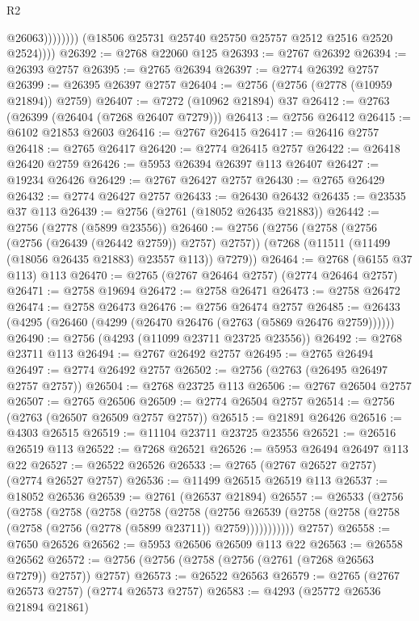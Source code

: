 \begin{lexlean}{R2}
\begin{coremodule}
                          @26063))))))))
          (@18506 @25731 @25740 @25750 @25757 @2512 @2516 @2520 @2524))))
@26392 := @2768 @22060 @125
@26393 := @2767 @26392
@26394 := @26393 @2757
@26395 := @2765 @26394
@26397 := @2774 @26392 @2757
@26399 := @26395 @26397 @2757
@26404 := @2756 (@2756 (@2778 (@10959 @21894)) @2759)
@26407 := @7272 (@10962 @21894) @37
@26412 := @2763 (@26399 (@26404 (@7268 @26407 @7279)))
@26413 := @2756 @26412
@26415 := @6102 @21853 @2603
@26416 := @2767 @26415
@26417 := @26416 @2757
@26418 := @2765 @26417
@26420 := @2774 @26415 @2757
@26422 := @26418 @26420 @2759
@26426 := @5953 @26394 @26397 @113 @26407
@26427 := @19234 @26426
@26429 := @2767 @26427 @2757
@26430 := @2765 @26429
@26432 := @2774 @26427 @2757
@26433 := @26430 @26432
@26435 := @23535 @37 @113
@26439 := @2756 (@2761 (@18052 @26435 @21883))
@26442 := @2756 (@2778 (@5899 @23556))
@26460 := @2756
    (@2756
      (@2758 (@2756 (@2756 (@26439 (@26442 @2759)) @2757) @2757))
      (@7268 (@11511 (@11499 (@18056 @26435 @21883) @23557 @113)) @7279))
@26464 := @2768 (@6155 @37 @113) @113
@26470 := @2765 (@2767 @26464 @2757) (@2774 @26464 @2757)
@26471 := @2758 @19694
@26472 := @2758 @26471
@26473 := @2758 @26472
@26474 := @2758 @26473
@26476 := @2756 @26474 @2757
@26485 := @26433 (@4295 (@26460 (@4299 (@26470 @26476 (@2763 (@5869 @26476 @2759))))))
@26490 := @2756 (@4293 (@11099 @23711 @23725 @23556))
@26492 := @2768 @23711 @113
@26494 := @2767 @26492 @2757
@26495 := @2765 @26494
@26497 := @2774 @26492 @2757
@26502 := @2756 (@2763 (@26495 @26497 @2757 @2757))
@26504 := @2768 @23725 @113
@26506 := @2767 @26504 @2757
@26507 := @2765 @26506
@26509 := @2774 @26504 @2757
@26514 := @2756 (@2763 (@26507 @26509 @2757 @2757))
@26515 := @21891 @26426
@26516 := @4303 @26515
@26519 := @11104 @23711 @23725 @23556
@26521 := @26516 @26519 @113
@26522 := @7268 @26521
@26526 := @5953 @26494 @26497 @113 @22
@26527 := @26522 @26526
@26533 := @2765 (@2767 @26527 @2757) (@2774 @26527 @2757)
@26536 := @11499 @26515 @26519 @113
@26537 := @18052 @26536
@26539 := @2761 (@26537 @21894)
@26557 := @26533
    (@2756
      (@2758
        (@2758
          (@2758
            (@2758
              (@2758
                (@2756
                  @26539
                  (@2758 (@2758 (@2758 (@2758 (@2756 (@2778 (@5899 @23711)) @2759)))))))))))
      @2757)
@26558 := @7650 @26526
@26562 := @5953 @26506 @26509 @113 @22
@26563 := @26558 @26562
@26572 := @2756 (@2756 (@2758 (@2756 (@2761 (@7268 @26563 @7279)) @2757)) @2757)
@26573 := @26522 @26563
@26579 := @2765 (@2767 @26573 @2757) (@2774 @26573 @2757)
@26583 := @4293 (@25772 @26536 @21894 @21861)

\end{coremodule}
\end{lexlean}
